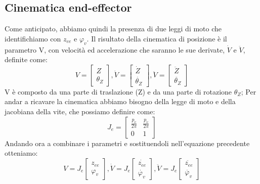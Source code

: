 \subsection{Cinematica end-effector}
Come anticipato, abbiamo quindi la presenza di due leggi di moto che identifichiamo con $z_{ee}$ e $\varphi_v$. Il risultato della cinematica di posizione è il parametro V, con velocità ed accelerazione che saranno le sue derivate, $\dot{V}$ e $\ddot{V}$, definite come: 
\begin{equation*}
	V = 
	\begin{bmatrix}
		Z \\ 
		\theta_Z
	\end{bmatrix}, 
	\dot{V} = 
	\begin{bmatrix}
		\dot{Z} \\ \dot{\theta_Z}
	\end{bmatrix},
	\ddot{V} =
	\begin{bmatrix}
		\ddot{Z} \\ \ddot{\theta_Z}
	\end{bmatrix}
\end{equation*}
V è composto da una parte di traslazione (Z) e da una parte di rotazione $\theta_Z$; Per andar a ricavare la cinematica abbiamo  bisogno della legge di moto e della jacobiana della vite, che possiamo definire come:
\begin{equation}
J_e =
    \begin{bmatrix}
    \frac{p_v}{2 \pi} & \frac{p_v}{2 \pi} \\
    0 & 1
    \end{bmatrix}
\end{equation}
Andando ora a combinare i parametri e sostituendoli nell'equazione precedente otteniamo:
\begin{equation}
    V = J_e \begin{bmatrix}
    z_{ee} \\ \varphi_v
    \end{bmatrix},
    \dot{V} = J_e \begin{bmatrix}
    \dot{z_{ee}} \\ \dot{\varphi_v}
    \end{bmatrix},
    \ddot{V} = J_e \begin{bmatrix}
    \ddot{z_{ee}} \\ \ddot{\varphi_v}
    \end{bmatrix}
\end{equation}

